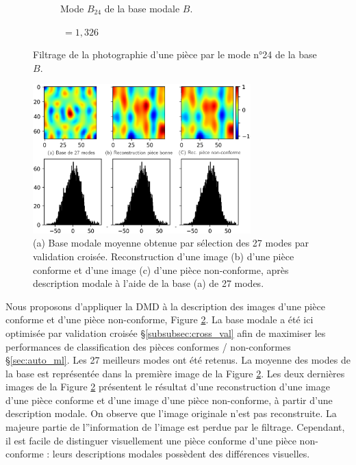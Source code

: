 \begin{figure}[htb]
\begin{subfigure}[c]{0.37\textwidth}
		\caption{Mode $B_{24}$ de la base modale $B$.}
	\end{subfigure}
	\begin{subfigure}[r]{0.20\textwidth}
		$\ = 1,326$
	\end{subfigure}
	\caption{Filtrage de la photographie d'une pièce par le mode n°24 de la base $B$.}
	\label{fig:dmd_filtering}
\end{figure}

\bigskip

\begin{figure}[bht]
	\centering
	\includegraphics[width=0.75\textwidth]{../Chap2/Figures/DMD_reconstruction_27modes.png}
	\caption{(a) Base modale moyenne obtenue par sélection des 27 modes par validation croisée. Reconstruction d'une image (b) d'une pièce conforme et d'une image (c) d'une pièce non-conforme, après description modale à l'aide de la base (a) de 27 modes.}
	\label{fig:dmd_reconstruction}
\end{figure}

Nous proposons d'appliquer la DMD à la description des images d'une pièce conforme et d'une pièce non-conforme, Figure \ref{fig:dmd_reconstruction}.
La base modale a été ici optimisée par validation croisée §\ref{subsubsec:cross_val} afin de maximiser les performances de classification des pièces conformes / non-conformes §\ref{sec:auto_ml}.
Les 27 meilleurs modes ont été retenus.
La moyenne des modes de la base est représentée dans la première image de la Figure \ref{fig:dmd_reconstruction}.
Les deux dernières images de la Figure \ref{fig:dmd_reconstruction} présentent le résultat d'une reconstruction d'une image d'une pièce conforme et d'une image d'une pièce non-conforme, à partir d'une description modale.
On observe que l'image originale n'est pas reconstruite.
La majeure partie de l''information de l'image est perdue par le filtrage.
Cependant, il est facile de distinguer visuellement une pièce conforme d'une pièce non-conforme : leurs descriptions modales possèdent des différences visuelles.

